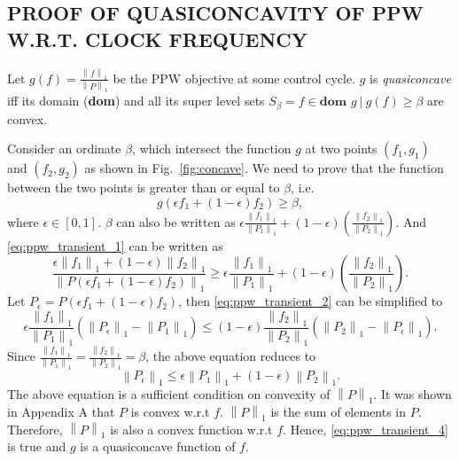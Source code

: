 \begin{appendices}
\section{PROOF OF QUASICONCAVITY OF PPW W.R.T. CLOCK FREQUENCY}
Let $g(f) = \frac{\left \| f \right \|_{1}}{\left \| P \right \|_{1}}$ be the PPW objective at some control cycle. $g$ is \emph{quasiconcave} iff its domain (\textbf{dom}) and all its super level sets $\mathit{S_{\beta}} = {f \in \textbf{dom } g~|~g(f)\geq \beta}$ are convex. 

Consider an ordinate $\beta$, which intersect the function $g$ at two points $(f_{1},g_{1})$ and $(f_{2},g_{2})$ as shown in Fig.~\ref{fig:concave}. We need to prove that the function between the two points is greater than or equal to $\beta$, i.e.
\begin{equation}\label{eq:ppw_transient_1}
g(\epsilon f_{1}+(1-\epsilon)f_{2})\geq \beta,
\end{equation}
where $\epsilon \in [0,1]$. $\beta$ can also be written as $\epsilon \frac{\left \| f_{1} \right \|_{1}}{\left \| P_{1} \right \|_{1}}+(1-\epsilon) (\frac{\left \| f_{2} \right \|_{1}}{\left \| P_{2} \right \|_{1}})$. And \eqref{eq:ppw_transient_1} can be written as
\begin{equation}\label{eq:ppw_transient_2}
\frac{\epsilon \left \| f_{1} \right \|_{1}+(1-\epsilon)\left \| f_{2} \right \|_{1}}{\left \|P(\epsilon f_{1}+(1-\epsilon)f_{2})\right \|_{1}} \geq \epsilon \frac{\left \| f_{1} \right \|_{1}}{\left \| P_{1} \right \|_{1}}+(1-\epsilon) (\frac{\left \| f_{2} \right \|_{1}}{\left \| P_{2} \right \|_{1}}).
\end{equation}
Let $P_{\epsilon}=P(\epsilon f_{1}+(1-\epsilon)f_{2})$, then \eqref{eq:ppw_transient_2} can be simplified to
\begin{equation}\label{eq:ppw_transient_3}
\epsilon\frac{\left \| f_{1} \right \|_{1}}{\left \| P_{1} \right \|_{1}}(\left \|P_{\epsilon}\right \|_{1}-\left \|P_{1}\right \|_{1})\leq(1-\epsilon)\frac{\left \| f_{2} \right \|_{1}}{\left \| P_{2} \right \|_{1}}(\left \|P_{2}\right \|_{1}-\left \|P_{\epsilon}\right \|_{1}).
\end{equation}
Since $\frac{\left \| f_{1} \right \|_{1}}{\left \| P_{1} \right \|_{1}}=\frac{\left \| f_{2} \right \|_{1}}{\left \| P_{2} \right \|_{1}}=\beta$, the above equation reduces to
\begin{equation}\label{eq:ppw_transient_4}
\left \|P_{\epsilon}\right \|_{1} \leq \epsilon \left \| P_{1} \right \|_{1}+(1-\epsilon)\left \| P_{2} \right \|_{1}.
\end{equation}
The above equation is a sufficient condition on convexity of $\left \| P \right \|_{1}$. It was shown in Appendix A that $P$ is convex w.r.t $f$. $\left \| P \right \|_{1}$ is the sum of elements in $P$. Therefore, $\left \| P \right \|_{1}$ is also a convex function w.r.t $f$. Hence, \eqref{eq:ppw_transient_4} is true and $g$ is a quasiconcave function of $f$.
\end{appendices}